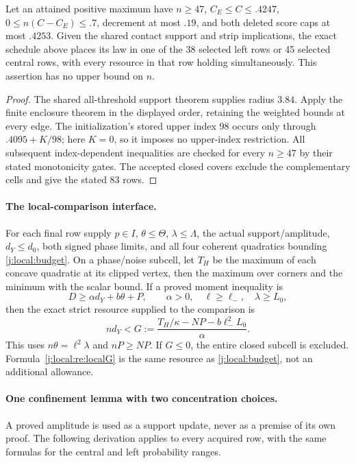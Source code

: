 \begin{corollary}\label{j:local:re:acquired}
Let an attained positive maximum have $n\ge47$, $C_E\le C\le.4247$,
$0\le n(C-C_E)\le.7$, decrement at most $.19$, and both deleted
score caps at most $.4253$.
Given the shared contact support and strip implications, the exact
schedule above places its law in one of the 38 selected left rows or
45 selected central rows, with every resource in that row holding
simultaneously. This assertion has no upper bound on $n$.
\end{corollary}
\begin{proof}
The shared all-threshold support theorem supplies radius $3.84$.
Apply the finite enclosure theorem in the displayed order, retaining
the weighted bounds at every edge. The initialization's stored upper
index 98 occurs only through $.4095+K/98$; here $K=0$, so it imposes
no upper-index restriction. All subsequent index-dependent inequalities
are checked for every $n\ge47$ by their stated monotonicity gates.
The accepted closed covers exclude the complementary cells and give
the stated 83 rows.
\end{proof}

\paragraph{The local-comparison interface.}
For each final row supply $p\in I$, $\theta\le\Theta$, $\lambda\le\Lambda$,
the actual support/amplitude, $d_Y\le d_0$, both signed phase limits,
and all four coherent quadratics bounding \eqref{j:local:budget}.
On a phase/noise subcell, let $T_H$ be the maximum of each concave
quadratic at its clipped vertex, then the maximum over corners and the
minimum with the scalar bound. If a proved moment inequality is
\[
 D\ge\alpha d_Y+b\theta+P,\qquad\alpha>0,
 \quad \ell\ge\ell_-,\quad\lambda\ge L_0,
\]
then the exact strict resource supplied to the comparison is
\begin{equation}\label{j:local:re:localG}
 nd_Y<G:=\frac{T_H/\kappa-NP-b\ell_-^2L_0}{\alpha}.
\end{equation}
This uses $n\theta=\ell^2\lambda$ and $nP\ge NP$. If $G\le0$,
the entire closed subcell is excluded. Formula~\eqref{j:local:re:localG} is
the same resource as \eqref{j:local:budget}, not an additional allowance.

\paragraph{One confinement lemma with two concentration choices.}\label{j:local:confinement}
A proved amplitude is used as a support update, never as a premise of
its own proof. The following derivation applies to every acquired row,
with the same formulas for the central and left probability ranges.
